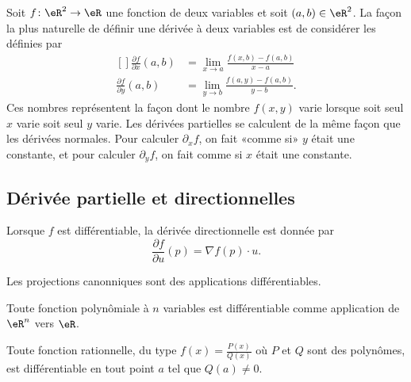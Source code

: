Soit \( f\colon \eR^2\to \eR\) une fonction de deux variables et soit \( (a,b)\in\eR^2\). La façon la plus naturelle de définir une dérivée à deux variables est de considérer les  définies par
\begin{equation}
	\begin{aligned}[]
		\frac{ \partial f }{ \partial x }(a,b) & =\lim_{x\to a} \frac{ f(x,b)-f(a,b) }{ x-a } \\
		\frac{ \partial f }{ \partial y }(a,b) & =\lim_{y\to b} \frac{ f(a,y)-f(a,b) }{y-b}.
	\end{aligned}
\end{equation}
Ces nombres représentent la façon dont le nombre \( f(x,y)\) varie lorsque soit seul \( x\) varie soit seul \( y\) varie. Les dérivées partielles se calculent de la même façon que les dérivées normales. Pour calculer \( \partial_xf\), on fait «comme si» \( y\) était une constante, et pour calculer \( \partial_yf\), on fait comme si \( x\) était une constante.

\subsection{Dérivée partielle et directionnelles}

Lorsque \( f\) est différentiable, la dérivée directionnelle est donnée par
\begin{equation}        \label{EqDerDirnablau}
	\frac{ \partial f }{ \partial u }(p)=\nabla f(p)\cdot u.
\end{equation}


\begin{lemma}       \label{LEMooASGNooCWqAmN}
	Les projections canonniques sont des applications différentiables.
\end{lemma}

\begin{lemma}       \label{LEMooGYJUooOudNLH}
	Toute fonction polynômiale à \( n\) variables est différentiable comme application de \( \eR^n\) vers \( \eR\).
\end{lemma}

\begin{lemma}       \label{LEMooUMRXooDUQHpK}
	Toute fonction rationnelle, du type \( f(x) = \frac{P(x)}{Q(x)}\) où \( P\) et \( Q\) sont des polynômes, est différentiable en tout point \( a\) tel que \( Q(a) \neq 0\).
\end{lemma}


